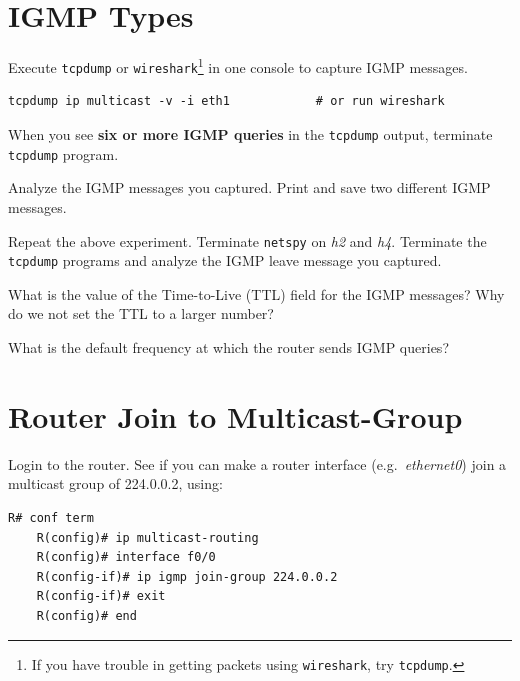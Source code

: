 \documentclass{UTNetLab}
\begin{document}
\section{IGMP Types}
    Execute \lstinline{tcpdump} or \lstinline{wireshark}\footnote{If you have trouble in getting packets using \lstinline{wireshark}, try \lstinline{tcpdump}.} in one console to capture IGMP messages.

    \begin{lstlisting}[emph={eth0}]
	tcpdump ip multicast -v -i eth1            # or run wireshark
    \end{lstlisting}
    When you see \textbf{six or more IGMP queries} in the \lstinline{tcpdump} output, terminate \lstinline{tcpdump} program.

    Analyze the IGMP messages you captured.
    Print and save two different IGMP messages.

    Repeat the above experiment.
    Terminate \lstinline{netspy} on \textit{h2} and \textit{h4}.
    Terminate the \lstinline{tcpdump} programs and analyze the IGMP leave message you captured.
    
    \begin{report}
        \item What is the value of the Time-to-Live (TTL) field for the IGMP messages?
            Why do we not set the TTL to a larger number?

        \item What is the default frequency at which the router sends IGMP queries?
    \end{report}

\section{Router Join to Multicast-Group}
    Login to the router.
    See if you can make a router interface (e.g.\ \textit{ethernet0}) join a multicast group of 224.0.0.2, using:

    \begin{lstlisting}[language={cisco}]
	R# conf term
    R(config)# ip multicast-routing
    R(config)# interface f0/0
    R(config-if)# ip igmp join-group 224.0.0.2
    R(config-if)# exit
    R(config)# end
    \end{lstlisting}
    
\end{document}
